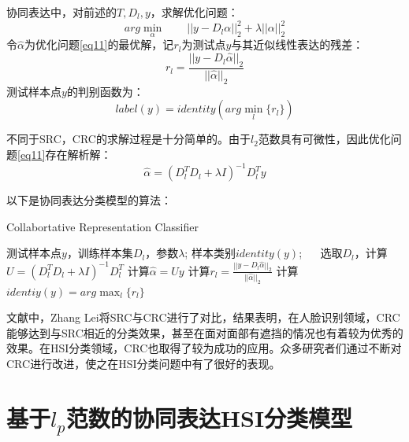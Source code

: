 \documentclass[12pt,a4paper]{article}
\begin{document}
协同表达中，对前述的$T, D_{l}, y$，求解优化问题：
\begin{equation}
\label{eq11}
arg\min_{\alpha} \qquad ||y - D_{l}\alpha||_{2}^{2} + \lambda||\alpha||_{2}^{2}
\end{equation}
令$\hat{\alpha}$为优化问题\eqref{eq11}的最优解，记$r_{l}$为测试点$y$与其近似线性表达的残差：
\begin{equation*}
r_{l} = \frac{||y - D_{l}\hat{\alpha}||_{2}}{||\hat{\alpha}||_{2}}
\end{equation*}
测试样本点$y$的判别函数为：
\begin{equation*}
label(y) = identity(arg\min_{l}\{r_{l}\})
\end{equation*}

不同于SRC，CRC的求解过程是十分简单的。由于$l_{2}$范数具有可微性，因此优化问题\eqref{eq11}存在解析解：
\begin{equation}
\label{eq12}
\hat{\alpha} = (D_{l}^{T}D_{l} + \lambda I)^{-1}D_{l}^{T}y
\end{equation}

以下是协同表达分类模型的算法：

\begin{algorithm}[H] 
	\caption{Collabortative Representation Classifier}  
	\label{alg:CRC}  
	\begin{algorithmic}
		\REQUIRE 
			测试样本点$y$，训练样本集${D_{l}}$，参数$\lambda$;
		\ENSURE 
			样本类别$identity(y)$;
		\STATE $\quad$
		\REPEAT   
			\STATE 选取$D_{l}$，计算$U = (D_{l}^{T}D_{l} + \lambda I)^{-1}D_{l}^{T}$ 
			\STATE 计算$\hat{\alpha} = Uy$
			\STATE 计算$r_{l} = \frac{||y - D_{l}\hat{\alpha}||_{2}}{||\hat{\alpha}||_{2}}$
		\STATE 计算$identiy(y) = arg\max_{l} \{r_{l}\}$
	\end{algorithmic}  
\end{algorithm}  

文献\cite{Zhang L}中，Zhang Lei将SRC与CRC进行了对比，结果表明，在人脸识别领域，CRC能够达到与SRC相近的分类效果，甚至在面对面部有遮挡的情况也有着较为优秀的效果。在HSI分类领域，CRC也取得了较为成功的应用。众多研究者们通过不断对CRC进行改进，使之在HSI分类问题中有了很好的表现。



\section{基于$l_{p}$范数的协同表达HSI分类模型}
\end{document}
